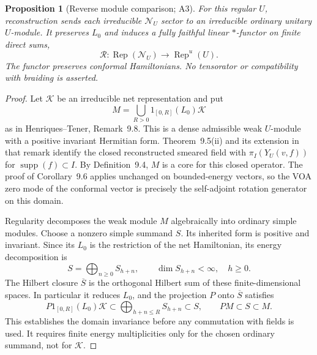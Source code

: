 \documentclass[11pt,a4paper]{article}
\newtheorem{proposition}[theorem]{Proposition}
\theoremstyle{definition}
\DeclareMathOperator{\Rep}{Rep}
\begin{document}
\begin{proposition}[Reverse module comparison; A3]
\label{clm:analytic-reconstruction}
For this regular $U$, reconstruction sends each irreducible
$\mathcal N_U$ sector to an irreducible ordinary unitary $U$-module.
It preserves $L_0$ and induces a fully faithful linear $*$-functor on
finite direct sums,
\[
 \mathcal R:\Rep(\mathcal N_U)\longrightarrow\Rep^{u}(U).
\]
The functor preserves conformal Hamiltonians.  No tensorator or
compatibility with braiding is asserted.
\end{proposition}
\begin{proof}
Let $\mathcal K$ be an irreducible net representation and put
\[
 M=\bigcup_{R>0}1_{[0,R]}(L_0)\mathcal K
\]
as in Henriques--Tener, Remark~9.8.  This is a dense admissible weak
$U$-module with a positive invariant Hermitian form.  Theorem~9.5(ii)
and its extension in that remark identify the closed reconstructed
smeared field with $\pi_I(Y_U(v,f))$ for
$\operatorname{supp}(f)\subset I$.  By Definition~9.4, $M$ is a
core for this closed operator.  The proof of Corollary~9.6 applies
unchanged on bounded-energy vectors, so the VOA zero mode of the
conformal vector is precisely the self-adjoint rotation generator on
this domain.

Regularity decomposes the weak module $M$ algebraically into ordinary
simple modules.  Choose a nonzero simple summand $S$.  Its inherited
form is positive and invariant.  Since its $L_0$ is the restriction
of the net Hamiltonian, its energy decomposition is
\[
 S=\bigoplus_{n\geq0}S_{h+n},\qquad
 \dim S_{h+n}<\infty,\quad h\geq0.
\]
The Hilbert closure $\overline S$ is the orthogonal Hilbert sum of
these finite-dimensional spaces.  In particular it reduces $L_0$,
and the projection $P$ onto $\overline S$ satisfies
\begin{equation}
 P1_{[0,R]}(L_0)\mathcal K
   \subset\bigoplus_{h+n\leq R}S_{h+n}\subset S,
 \qquad PM\subset S\subset M.
 \label{eq:analytic-projection-core}
\end{equation}
This establishes the domain invariance before any commutation with
fields is used.  It requires finite energy multiplicities only for the
chosen ordinary summand, not for $\mathcal K$.


\end{proof}
\end{document}
